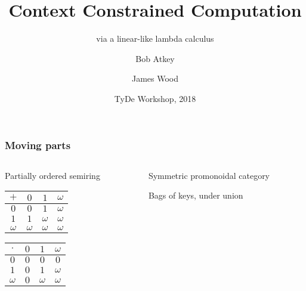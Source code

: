 \documentclass{beamer}
\title{Context Constrained Computation}
\subtitle{via a linear-like lambda calculus}
\author{Bob Atkey\inst{1} \and James Wood\inst{1}}
\institute{\inst{1}University of Strathclyde}
\date{TyDe Workshop, 2018}
\begin{document}
  \frame{\titlepage}
  \begin{frame}
    \frametitle{Moving parts}

    \begin{columns}[onlytextwidth,T]
      \begin{column}{0.5\textwidth}
        \centering
        Partially ordered semiring

        \begin{table}[]
          \begin{tabular}{c|ccc}
            $+$      & $0$      & $1$      & $\omega$
            \\ \hline
            $0$      & $0$      & $1$      & $\omega$
            \\
            $1$      & $1$      & $\omega$ & $\omega$
            \\
            $\omega$ & $\omega$ & $\omega$ & $\omega$
          \end{tabular}
        \end{table}
        \begin{table}[]
          \begin{tabular}{c|ccc}
            $\cdot$  & $0$ & $1$      & $\omega$
            \\ \hline
            $0$      & $0$ & $0$      & $0$
            \\
            $1$      & $0$ & $1$      & $\omega$
            \\
            $\omega$ & $0$ & $\omega$ & $\omega$
          \end{tabular}
        \end{table}
      \end{column}
      \begin{column}{0.5\textwidth}
        \centering
        Symmetric promonoidal category

        Bags of keys, under union
      \end{column}
    \end{columns}
  \end{frame}
\end{document}
